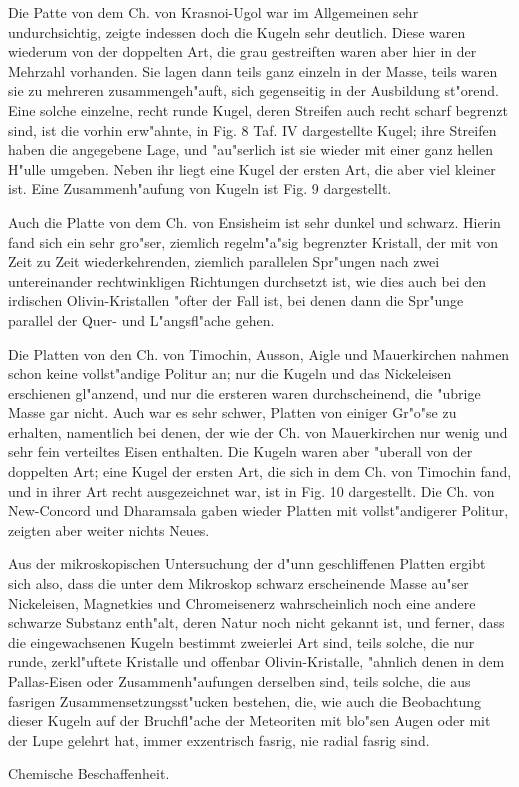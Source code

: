 \documentclass[a4paper, 11pt, oneside, german]{article}
\begin{document}
Die Patte von dem Ch. von Krasnoi-Ugol war im Allgemeinen sehr undurchsichtig, zeigte indessen doch die Kugeln sehr deutlich. Diese waren wiederum von der doppelten Art, die grau gestreiften waren aber hier in der Mehrzahl vorhanden. Sie lagen dann teils ganz einzeln in der Masse, teils waren sie zu mehreren zusammengeh"auft, sich gegenseitig in der Ausbildung st"orend. Eine solche einzelne, recht runde Kugel, deren Streifen auch recht scharf begrenzt sind, ist die vorhin erw"ahnte, in Fig. 8 Taf. IV dargestellte Kugel; ihre Streifen haben die angegebene Lage, und "au"serlich ist sie wieder mit einer ganz hellen H"ulle umgeben. Neben ihr liegt eine Kugel der ersten Art, die aber viel kleiner ist. Eine Zusammenh"aufung von Kugeln ist Fig. 9 dargestellt.

Auch die Platte von dem Ch. von Ensisheim ist sehr dunkel und schwarz. Hierin fand sich ein sehr gro"ser, ziemlich regelm"a"sig begrenzter Kristall, der mit von Zeit zu Zeit wiederkehrenden, ziemlich parallelen Spr"ungen nach zwei untereinander rechtwinkligen Richtungen durchsetzt ist, wie dies auch bei den irdischen Olivin-Kristallen "ofter der Fall ist, bei denen dann die Spr"unge parallel der Quer- und L"angsfl"ache gehen.

Die Platten von den Ch. von Timochin, Ausson, Aigle und Mauerkirchen nahmen schon keine vollst"andige Politur an; nur die Kugeln und das Nickeleisen erschienen gl"anzend, und nur die ersteren waren durchscheinend, die "ubrige Masse gar nicht. Auch war es sehr schwer, Platten von einiger Gr"o"se zu erhalten, namentlich bei denen, der wie der Ch. von Mauerkirchen nur wenig und sehr fein verteiltes Eisen enthalten. Die Kugeln waren aber "uberall von der doppelten Art; eine Kugel der ersten Art, die sich in dem Ch. von Timochin fand, und in ihrer Art recht ausgezeichnet war, ist in Fig. 10 dargestellt. Die Ch. von New-Concord und Dharamsala gaben wieder Platten mit vollst"andigerer Politur, zeigten aber weiter nichts Neues.

Aus der mikroskopischen Untersuchung der d"unn geschliffenen Platten ergibt sich also, dass die unter dem Mikroskop schwarz erscheinende Masse au"ser Nickeleisen, Magnetkies und Chromeisenerz wahrscheinlich noch eine andere schwarze Substanz enth"alt, deren Natur noch nicht gekannt ist, und ferner, dass die eingewachsenen Kugeln bestimmt zweierlei Art sind, teils solche, die nur runde, zerkl"uftete Kristalle und offenbar Olivin-Kristalle, "ahnlich denen in dem Pallas-Eisen oder Zusammenh"aufungen derselben sind, teils solche, die aus fasrigen Zusammensetzungsst"ucken bestehen, die, wie auch die Beobachtung dieser Kugeln auf der Bruchfl"ache der Meteoriten mit blo"sen Augen oder mit der Lupe gelehrt hat, immer exzentrisch fasrig, nie radial fasrig sind.
\begin{center}
Chemische Beschaffenheit.
\end{center}
\end{document}
